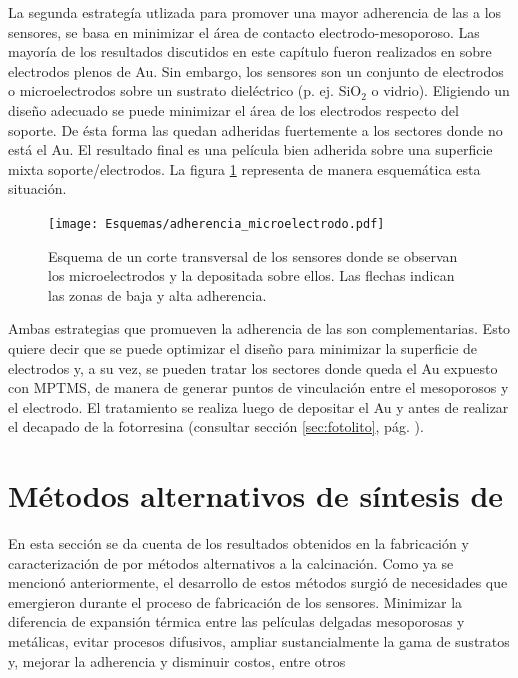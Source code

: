 			La segunda estrategía utlizada para promover una mayor adherencia de las \pdm\space a los sensores, se basa en minimizar el área de contacto electrodo-mesoporoso. Las mayoría de los resultados discutidos en este capítulo fueron realizados en \pdm\space sobre electrodos plenos de Au. Sin embargo, los sensores son un conjunto de electrodos o microelectrodos sobre un sustrato dieléctrico (p. ej. SiO$_2$ o vidrio). Eligiendo un diseño adecuado se puede minimizar el área de los electrodos respecto del soporte. De ésta forma las \pdm\space quedan adheridas fuertemente a los sectores donde no está el Au. El resultado final es una película bien adherida sobre una superficie mixta soporte/electrodos.  La figura \ref{fig:adherencia_microelectrodo} representa de manera esquemática esta situación.
			
				\begin{figure}[!ht]
					\begin{center}
					\texttt{[image: Esquemas/adherencia\_microelectrodo.pdf]}
					\caption[Adherencia a los microelectrodos.]{Esquema de un corte transversal de los sensores donde se observan los microelectrodos y la \pdm\space depositada sobre ellos. Las flechas indican las zonas de baja y alta adherencia.}
					\label{fig:adherencia_microelectrodo}
					\end{center}
					\end{figure}
			
			Ambas estrategias que promueven la adherencia de las \pdm\space son complementarias. Esto quiere decir que se puede optimizar el diseño para minimizar la superficie de electrodos y, a su vez, se pueden tratar los sectores donde queda el Au expuesto con MPTMS, de manera de generar puntos de vinculación entre el mesoporosos y el electrodo. El tratamiento se realiza luego de depositar el Au y antes de realizar el decapado de la fotorresina (consultar sección \ref{sec:fotolito}, pág. \pageref{sec:fotolito}).		

\section{Métodos alternativos de síntesis de \pdm}
	
	 En esta sección se da cuenta de los resultados obtenidos en la fabricación y caracterización de \pdm\space por métodos alternativos a la calcinación. Como ya se mencionó anteriormente, el desarrollo de estos métodos surgió de necesidades que emergieron durante el proceso de fabricación de los sensores. Minimizar la diferencia de expansión térmica entre las películas delgadas mesoporosas y metálicas, evitar procesos difusivos, ampliar sustancialmente la gama de sustratos y, mejorar la adherencia y disminuir costos, entre otros

